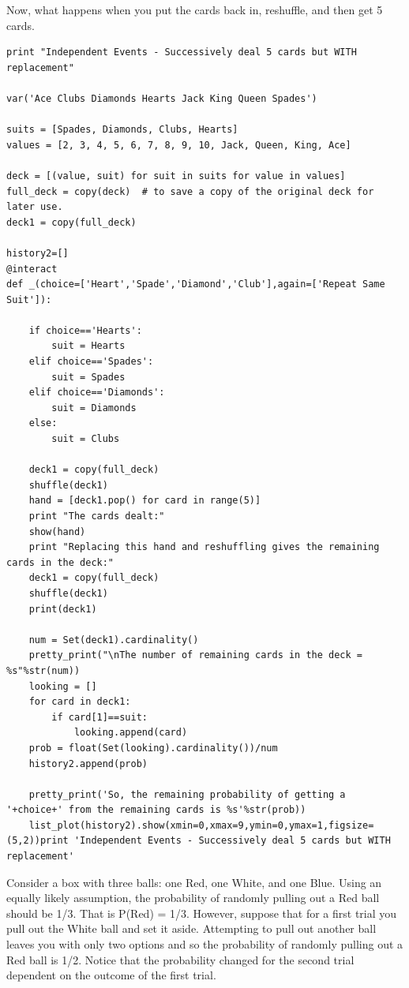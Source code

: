 \documentclass[10pt,]{book}
\theoremstyle{plain}
\theoremstyle{definition}
\theoremstyle{definition}
\theoremstyle{definition}
\numberwithin{equation}{section}
\begin{document}
\par
Now, what happens when you put the cards back in, reshuffle, and then get 5 cards.%
\begin{lstlisting}[style=sageinput]
print "Independent Events - Successively deal 5 cards but WITH replacement"

var('Ace Clubs Diamonds Hearts Jack King Queen Spades') 

suits = [Spades, Diamonds, Clubs, Hearts] 
values = [2, 3, 4, 5, 6, 7, 8, 9, 10, Jack, Queen, King, Ace] 

deck = [(value, suit) for suit in suits for value in values]
full_deck = copy(deck)  # to save a copy of the original deck for later use.
deck1 = copy(full_deck)

history2=[]
@interact
def _(choice=['Heart','Spade','Diamond','Club'],again=['Repeat Same Suit']):

    if choice=='Hearts':
        suit = Hearts
    elif choice=='Spades':
        suit = Spades
    elif choice=='Diamonds':
        suit = Diamonds
    else:
        suit = Clubs

    deck1 = copy(full_deck)
    shuffle(deck1) 
    hand = [deck1.pop() for card in range(5)] 
    print "The cards dealt:"
    show(hand)
    print "Replacing this hand and reshuffling gives the remaining cards in the deck:"
    deck1 = copy(full_deck)
    shuffle(deck1)
    print(deck1)
    
    num = Set(deck1).cardinality()
    pretty_print("\nThe number of remaining cards in the deck = %s"%str(num))
    looking = []
    for card in deck1:
        if card[1]==suit:
            looking.append(card)
    prob = float(Set(looking).cardinality())/num
    history2.append(prob)
    
    pretty_print('So, the remaining probability of getting a '+choice+' from the remaining cards is %s'%str(prob))
    list_plot(history2).show(xmin=0,xmax=9,ymin=0,ymax=1,figsize=(5,2))print 'Independent Events - Successively deal 5 cards but WITH replacement'
\end{lstlisting}
  Consider a box with three balls: one Red, one White, and one Blue.  Using an equally likely assumption, the probability of randomly pulling out a Red ball should be 1/3.  That is P(Red) = 1/3.  However, suppose that for a first trial you pull out the White ball and set it aside. Attempting to pull out another ball leaves you with only two options and so the probability of randomly pulling out a Red ball is 1/2. Notice that the probability changed for the second trial dependent on the outcome of the first trial.%
\par
\end{document}

